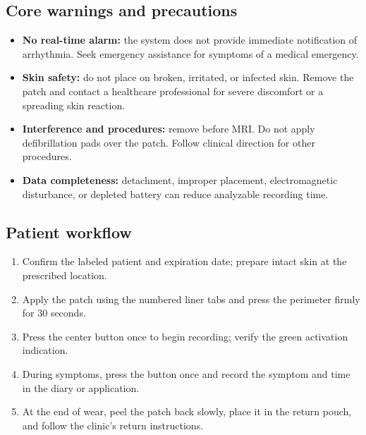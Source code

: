 \subsection{Core warnings and precautions}
\begin{warningbox}
\begin{itemize}
  \item \textbf{No real-time alarm:} the system does not provide immediate notification of arrhythmia. Seek emergency assistance for symptoms of a medical emergency.
  \item \textbf{Skin safety:} do not place on broken, irritated, or infected skin. Remove the patch and contact a healthcare professional for severe discomfort or a spreading skin reaction.
  \item \textbf{Interference and procedures:} remove before MRI. Do not apply defibrillation pads over the patch. Follow clinical direction for other procedures.
  \item \textbf{Data completeness:} detachment, improper placement, electromagnetic disturbance, or depleted battery can reduce analyzable recording time.
\end{itemize}
\end{warningbox}

\subsection{Patient workflow}
\begin{enumerate}
  \item Confirm the labeled patient and expiration date; prepare intact skin at the prescribed location.
  \item Apply the patch using the numbered liner tabs and press the perimeter firmly for 30 seconds.
  \item Press the center button once to begin recording; verify the green activation indication.
  \item During symptoms, press the button once and record the symptom and time in the diary or application.
  \item At the end of wear, peel the patch back slowly, place it in the return pouch, and follow the clinic's return instructions.
\end{enumerate}

